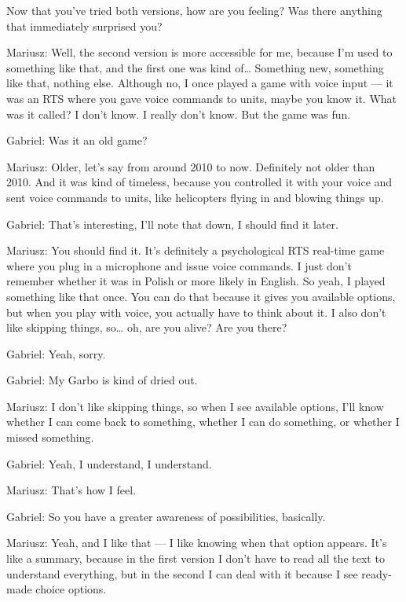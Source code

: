 \begin{QandA}
   \item Now that you’ve tried both versions, how are you feeling? Was there anything that immediately surprised you?
         \begin{answered}
            Mariusz: Well, the second version is more accessible for me, because I’m used to something like that, and the first one was kind of…
            Something new, something like that, nothing else.
            Although no, I once played a game with voice input — it was an RTS where you gave voice commands to units, maybe you know it.
            What was it called?
            I don’t know.
            I really don’t know.
            But the game was fun.

            Gabriel: Was it an old game?
            
            Mariusz: Older, let’s say from around 2010 to now.
            Definitely not older than 2010.
            And it was kind of timeless, because you controlled it with your voice and sent voice commands to units, like helicopters flying in and blowing things up.

            Gabriel: That’s interesting, I’ll note that down, I should find it later.

            Mariusz: You should find it.
            It’s definitely a psychological RTS real-time game where you plug in a microphone and issue voice commands.
            I just don’t remember whether it was in Polish or more likely in English.
            So yeah, I played something like that once.
            You can do that because it gives you available options, but when you play with voice, you actually have to think about it.
            I also don’t like skipping things, so… oh, are you alive? Are you there?

            Gabriel: Yeah, sorry.

            Gabriel: My Garbo is kind of dried out.

            Mariusz: I don’t like skipping things, so when I see available options, I’ll know whether I can come back to something, whether I can do something, or whether I missed something.

            Gabriel: Yeah, I understand, I understand.

            Mariusz: That’s how I feel.

            Gabriel: So you have a greater awareness of possibilities, basically.

            Mariusz: Yeah, and I like that — I like knowing when that option appears.
            It’s like a summary, because in the first version I don’t have to read all the text to understand everything, but in the second I can deal with it because I see ready-made choice options.


\end{answered}
\end{QandA}
